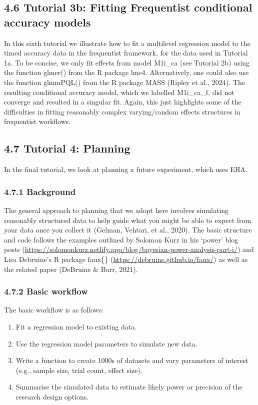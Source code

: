 \documentclass[
  man, donotrepeattitle,floatsintext]{apa6}
\providecommand{\tightlist}{%
  \setlength{\itemsep}{0pt}\setlength{\parskip}{0pt}}
\begin{document}
\subsection{4.6 Tutorial 3b: Fitting Frequentist conditional accuracy models}\label{tutorial-3b-fitting-frequentist-conditional-accuracy-models}

In this sixth tutorial we illustrate how to fit a multilevel regression model to the timed accuracy data in the frequentist framework, for the data used in Tutorial 1a. To be concise, we only fit effects from model M1i\_ca (see Tutorial 2b) using the function glmer() from the R package lme4. Alternatively, one could also use the function glmmPQL() from the R package MASS (Ripley et al., 2024). The resulting conditional accuracy model, which we labelled M1i\_ca\_f, did not converge and resulted in a singular fit. Again, this just highlights some of the difficulties in fitting reasonably complex varying/random effects structures in frequentist workflows.

\subsection{4.7 Tutorial 4: Planning}\label{tutorial-4-planning}

In the final tutorial, we look at planning a future experiment, which uses EHA.

\subsubsection{4.7.1 Background}\label{background}

The general approach to planning that we adopt here involves simulating reasonably structured data to help guide what you might be able to expect from your data once you collect it (Gelman, Vehtari, et al., 2020).
The basic structure and code follows the examples outlined by Solomon Kurz in his `power' blog posts (\url{https://solomonkurz.netlify.app/blog/bayesian-power-analysis-part-i/}) and Lisa Debruine's R package faux\{\} (\url{https://debruine.github.io/faux/}) as well as the related paper (DeBruine \& Barr, 2021).

\subsubsection{4.7.2 Basic workflow}\label{basic-workflow}

The basic workflow is as follows:

\begin{enumerate}
\def\labelenumi{\arabic{enumi}.}
\tightlist
\item
  Fit a regression model to existing data.
\item
  Use the regression model parameters to simulate new data.
\item
  Write a function to create 1000s of datasets and vary parameters of interest (e.g., sample size, trial count, effect size).
\item
  Summarise the simulated data to estimate likely power or precision of the research design options.
\end{enumerate}
\end{document}
